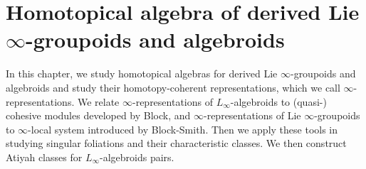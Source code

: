 \documentclass[12pt]{amsart}
\theoremstyle{definition}
\theoremstyle{remark}
\numberwithin{equation}{section}
\newcommand{\1}{{\mathbb{1}}}
\newcommand{\li}{L_{\infty}}
\begin{document}





 \part{Homotopical algebra of derived  Lie $\infty$-groupoids and algebroids}
 In this chapter,
 we study homotopical algebras for derived Lie $\infty$-groupoids and algebroids and study their homotopy-coherent representations, which we call $\infty$-representations. We relate $\infty$-representations  of $\li$-algebroids to (quasi-) cohesive modules developed by Block, and $\infty$-representations  of Lie $\infty$-groupoids to $\infty$-local system introduced by Block-Smith. Then we apply these tools in studying singular foliations and their characteristic classes. We then construct Atiyah classes for $\li$-algebroids pairs.
 
\end{document}
